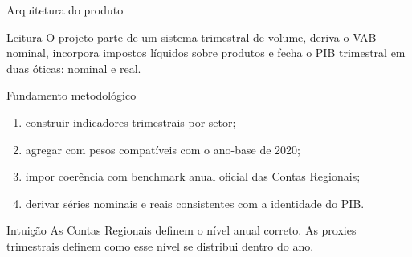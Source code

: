 \documentclass[aspectratio=169,11pt]{beamer}
\begin{document}
\begin{frame}{Arquitetura do produto}
\centering
{}

\vspace{0.35cm}
\begin{block}{Leitura}
O projeto parte de um sistema trimestral de volume, deriva o VAB nominal, incorpora impostos líquidos sobre produtos e fecha o PIB trimestral em duas óticas: nominal e real.
\end{block}
\end{frame}

\begin{frame}{Fundamento metodológico}
\begin{enumerate}
  \item construir indicadores trimestrais por setor;
  \item agregar com pesos compatíveis com o ano-base de 2020;
  \item impor coerência com benchmark anual oficial das Contas Regionais;
  \item derivar séries nominais e reais consistentes com a identidade do PIB.
\end{enumerate}

\vspace{0.3cm}
\begin{block}{Intuição}
As Contas Regionais definem o nível anual correto. As proxies trimestrais definem como esse nível se distribui dentro do ano.
\end{block}
\end{frame}
\end{document}
